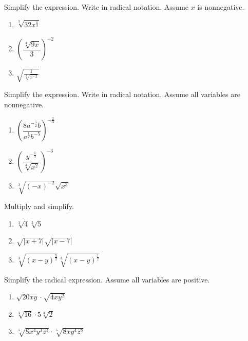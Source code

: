 \documentclass[en,11pt]{elegantbook}
\let\BeginKnitrBlock\begin \let\EndKnitrBlock\end
\begin{document}
\BeginKnitrBlock{exercise}
\protect\hypertarget{exr:unnamed-chunk-93}{}{\label{exr:unnamed-chunk-93} }
Simplify the expression. Write in radical notation. Assume \(x\) is nonnegative.

\begin{enumerate}
\def\labelenumi{\arabic{enumi}.}

\item
  \(\sqrt[5]{32x^{\frac13}}\)
\item
  \(\left(\dfrac{\sqrt[4]{9x}}{3}\right)^{-2}\)
\item
  \(\sqrt{\frac{1}{\sqrt[3]{x^{-2}}}}\)
\end{enumerate}
\EndKnitrBlock{exercise}

\BeginKnitrBlock{exercise}
\protect\hypertarget{exr:unnamed-chunk-94}{}{\label{exr:unnamed-chunk-94} }
Simplify the expression. Write in radical notation. Assume all variables are nonnegative.

\begin{enumerate}
\def\labelenumi{\arabic{enumi}.}

\item
  \(\left(\dfrac{8a^{-\frac{5}{2}}b}{a^{\frac12}b^{-5}}\right)^{-\frac23}\)
\item
  \(\left(\dfrac{y^{-\frac{1}{3}}}{\sqrt[3]{x^{2}}}\right)^{-3}\)
\item
  \(\sqrt[3]{(-x)^{-2}}\sqrt{x^3}\)
\end{enumerate}
\EndKnitrBlock{exercise}

\BeginKnitrBlock{exercise}
\protect\hypertarget{exr:unnamed-chunk-95}{}{\label{exr:unnamed-chunk-95} }
Multiply and simplify.

\begin{enumerate}
\def\labelenumi{\arabic{enumi}.}

\item
  \(\sqrt[3]{4}\sqrt[3]{5}\)
\item
  \(\sqrt{|x+7|}\sqrt{|x-7|}\)
\item
  \(\sqrt[3]{(x-y)^{\frac52}}\sqrt[3]{(x-y)^{\frac72}}\)
\end{enumerate}
\EndKnitrBlock{exercise}

\BeginKnitrBlock{exercise}
\protect\hypertarget{exr:unnamed-chunk-96}{}{\label{exr:unnamed-chunk-96} }
Simplify the radical expression. Assume all variables are positive.

\begin{enumerate}
\def\labelenumi{\arabic{enumi}.}

\item
  \(\sqrt{20xy}\cdot\sqrt{4xy^2}\)
\item
  \(\sqrt[3]{16}\cdot5\sqrt[3]{2}\)
\item
  \(\sqrt[5]{8x^4y^3z^3}\cdot\sqrt[5]{8xy^4z^8}\)
\end{enumerate}
\EndKnitrBlock{exercise}
\end{document}
